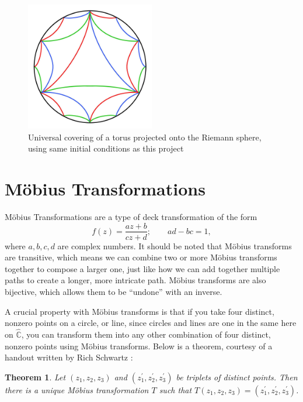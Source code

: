 \documentclass[12pt,a4paper,reqno,parskip=full]{amsart}
\numberwithin{equation}{section}
\theoremstyle{plain}
\newtheorem{theorem}[subsection]{Theorem}
\theoremstyle{definition}
\def\C{{\mathbb C}}
\begin{document}
\begin{figure}
    \centering
    \captionsetup{justification=centering}
    \includegraphics[width=0.5\textwidth]{images/RS colored detailed 2.jpg}
    \caption{Universal covering of a torus projected onto the Riemann sphere, using same initial conditions as this project}
    \label{fig:universal-covering-2}
\end{figure}

\section{Möbius Transformations}

Möbius Transformations are a type of deck transformation of the form \[f(z)=\frac{az+b}{cz+d};\quad\quad ad-bc=1,\]
where $a,b,c,d$ are complex numbers. It should be noted that Möbius transforms are transitive, which means we can combine two or more Möbius transforms together to compose a larger one, just like how we can add together multiple paths to create a longer, more intricate path. Möbius transforms are also bijective, which allows them to be ``undone'' with an inverse.

A crucial property with Möbius transforms is that if you take four distinct, nonzero points on a circle, or line, since circles and lines are one in the same here on $\hat\C$, you can transform them into any other combination of four distinct, nonzero points using Möbius transforms. Below is a theorem, courtesy of a handout written by Rich Schwartz \cite{Schwartz_2007}:
\begin{theorem}Let $(z_1,z_2,z_3)$ and $(z_1^\prime,z_2^\prime,z_3^\prime)$ be triplets of distinct points. Then there is a unique Möbius transformation $T$ such that $T(z_1,z_2,z_3)=(z_1^\prime,z_2^\prime,z_3^\prime)$.
\end{theorem}
\end{document}
